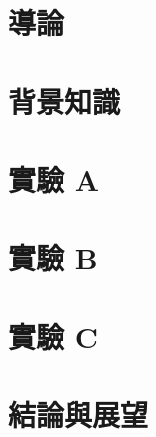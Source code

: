 \chapter{導論}
  
\chapter{背景知識}
  
\chapter{實驗 A}
  
\chapter{實驗 B}
  
\chapter{實驗 C}
  
\chapter{結論與展望}
  

